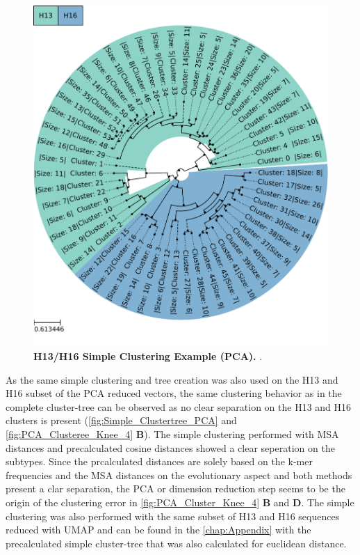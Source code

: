 \begin{figure}[!hbt]
    \centering
    \includegraphics[width=\textwidth]{PCA/Clustertree_Segment_4_H_Simple.pdf}
    \caption[H13/H16 Simple Clustering Example (\Acrshort{PCA})]{\textbf{H13/H16 Simple Clustering Example (\Acrshort{PCA}).} .}
    \label{fig:Simple_Clustertree_PCA}
\end{figure}

As the same simple clustering and tree creation was also used on the H13 and H16 subset of the \gls{PCA} reduced vectors, the same clustering behavior as in the complete cluster-tree can be observed as no clear separation on the H13 and H16 clusters is present (\autoref{fig:Simple_Clustertree_PCA} and \autoref{fig:PCA_Clusteree_Knee_4} \textbf{\textsf{B}}). The simple clustering performed with \gls{MSA} distances and precalculated cosine distances showed a clear seperation on the subtypes. Since the prcalculated distances are solely based on the k-mer frequencies and the \gls{MSA} distances on the evolutionary aspect and both methods present a clar separation, the \gls{PCA} or dimension reduction step seems to be the origin of the clustering error in \autoref{fig:PCA_Cluster_Knee_4} \textbf{\textsf{B}} and \textbf{\textsf{D}}. The simple clustering was also performed with the same subset of H13 and H16 sequences reduced with \gls{UMAP} and can be found in the \autoref{chap:Appendix} with the precalculated simple cluster-tree that was also calculated for euclidean distance.